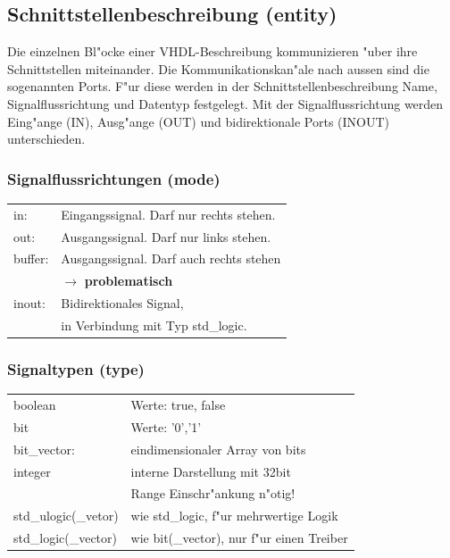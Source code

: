 	\subsection{Schnittstellenbeschreibung (entity)}
		Die einzelnen Bl"ocke einer VHDL-Beschreibung kommunizieren "uber ihre 
		Schnittstellen miteinander. Die Kommunikationskan"ale nach aussen sind die 
		sogenannten Ports. F"ur diese werden in der Schnittstellenbeschreibung Name, 		
		Signalflussrichtung und Datentyp festgelegt. Mit der Signalflussrichtung werden 
		Eing"ange (IN), Ausg"ange (OUT) und bidirektionale Ports (INOUT) unterschieden.
		\begin{multicols}{2}
			
			
		\end{multicols}
	\begin{multicols}{2}
	\subsubsection{Signalflussrichtungen (mode)}
		\begin{tabular}{ll}
			in: & Eingangssignal. Darf nur rechts stehen.\\
			out: & Ausgangssignal. Darf nur links stehen.\\
			buffer: & Ausgangssignal. Darf auch rechts stehen\\
			&  $\rightarrow$ \textbf{problematisch}\\
			inout: & Bidirektionales Signal, \\
			& in Verbindung mit Typ std\_logic.\\
		\end{tabular}
	\subsubsection{Signaltypen (type)}
		\begin{tabular}{ll}
			boolean & Werte: true, false\\
			bit & Werte: '0','1'\\
			bit\_vector: & eindimensionaler Array von bits\\
			integer & interne Darstellung mit 32bit\\
			& Range Einschr"ankung n"otig!\\
			std\_ulogic(\_vetor) & wie std\_logic, f"ur mehrwertige Logik\\
			std\_logic(\_vector) & wie bit(\_vector), nur f"ur einen Treiber\\
		\end{tabular}
	\end{multicols}
	

